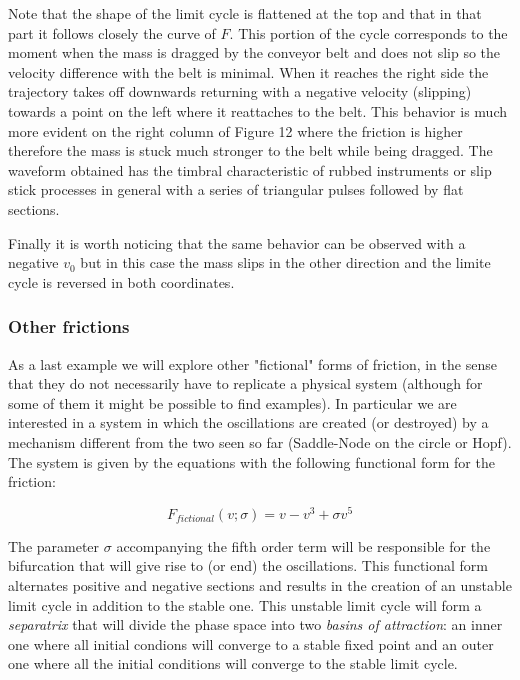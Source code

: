 \documentclass{article}
\begin{document}
Note that the shape of the limit cycle is flattened at the top and that in that part it follows closely the curve of $F$. 
This portion of the cycle corresponds to the moment when the mass is dragged by the conveyor belt and does not slip so the velocity difference with the belt is minimal. 
When it reaches the right side the trajectory takes off downwards returning with a negative velocity (slipping) towards a point on the left where it reattaches to the belt. 
This behavior is much more evident on the right column of Figure 12 where the friction is higher therefore the mass is stuck much stronger to the belt while being dragged. 
The waveform obtained has the timbral characteristic of rubbed instruments or slip stick processes in general with a series of triangular pulses followed by flat sections.

Finally it is worth noticing that the same behavior can be observed with a negative $v_0$ but in this case the mass slips in the other direction and the limite cycle is reversed in both coordinates.

\subsubsection{Other frictions}

As a last example we will explore other "fictional" forms of friction, in the sense that they do not necessarily have to replicate a physical system (although for some of them it might be possible to find examples). 
In particular we are interested in a system in which the oscillations are created (or destroyed) by a mechanism different from the two seen so far (Saddle-Node on the circle or Hopf). 
The system is given by the equations with the following functional form for the friction:

\begin{equation} \label{eq_fictional}
    F_{fictional}(v;\sigma) = v - v^3 + \sigma v^5  
\end{equation}

The parameter $\sigma$ accompanying the fifth order term will be responsible for the bifurcation that will give rise to (or end) the oscillations.
This functional form alternates positive and negative sections and results in the creation of an unstable limit cycle in addition to the stable one. 
This unstable limit cycle will form a {\em separatrix} that will divide the phase space into two {\em basins of attraction}: an inner one where all initial condions will converge to a stable fixed point and an outer one where all the initial conditions will converge to the stable limit cycle. 
\end{document}
